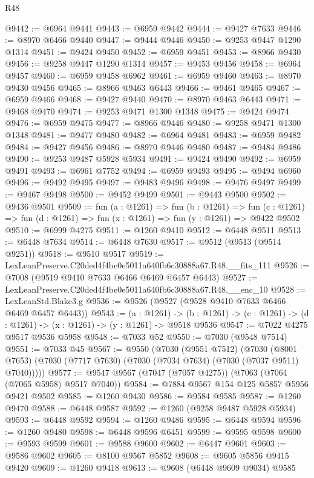 \begin{lexlean}{R48}
\begin{coremodule}
@9442 := @6964 @9441
@9443 := @6959 @9442
@9444 := @9427 @7633
@9446 := @8970 @6466 @9440
@9447 := @9444 @9446
@9450 := @9253 @9447 @1290 @1314
@9451 := @9424 @9450
@9452 := @6959 @9451
@9453 := @8966 @9430
@9456 := @9258 @9447 @1290 @1314
@9457 := @9453 @9456
@9458 := @6964 @9457
@9460 := @6959 @9458 @6962
@9461 := @6959 @9460
@9463 := @8970 @9430 @9456
@9465 := @8966 @9463 @6443
@9466 := @9461 @9465
@9467 := @6959 @9466
@9468 := @9427 @9440
@9470 := @8970 @9463 @6443
@9471 := @9468 @9470
@9474 := @9253 @9471 @1300 @1348
@9475 := @9424 @9474
@9476 := @6959 @9475
@9477 := @8966 @9446
@9480 := @9258 @9471 @1300 @1348
@9481 := @9477 @9480
@9482 := @6964 @9481
@9483 := @6959 @9482
@9484 := @9427 @9456
@9486 := @8970 @9446 @9480
@9487 := @9484 @9486
@9490 := @9253 @9487 @5928 @5934
@9491 := @9424 @9490
@9492 := @6959 @9491
@9493 := @6961 @7752
@9494 := @6959 @9493
@9495 := @9494 @6960
@9496 := @9492 @9495
@9497 := @9483 @9496
@9498 := @9476 @9497
@9499 := @9467 @9498
@9500 := @9452 @9499
@9501 := @9443 @9500
@9502 := @9436 @9501
@9509 := fun (a : @1261) =>
  fun (b : @1261) =>
  fun (c : @1261) => fun (d : @1261) => fun (x : @1261) => fun (y : @1261) => @9422 @9502
@9510 := @6999 @4275
@9511 := @1260 @9410
@9512 := @6448 @9511
@9513 := @6448 @7634
@9514 := @6448 @7630
@9517 := @9512 (@9513 (@9514 @9251))
@9518 := @9510 @9517
@9519 := LexLeanPreserve.C20ded4f4be0e5011a640fb6c30888a67.R48.__fits_111
@9526 := @7008 (@9519 @9410 @7633 @6466 @6469 @6457 @6443)
@9527 := LexLeanPreserve.C20ded4f4be0e5011a640fb6c30888a67.R48.__enc_10
@9528 := LexLeanStd.Blake3.g
@9536 := @9526 (@9527 (@9528 @9410 @7633 @6466 @6469 @6457 @6443))
@9543 := (a : @1261) ->
  (b : @1261) -> (c : @1261) -> (d : @1261) -> (x : @1261) -> (y : @1261) -> @9518 @9536
@9547 := @7022 @4275 @9517 @9536 @5958
@9548 := @7033 @52
@9550 := @7030 (@9548 @7514)
@9551 := @7033 @45
@9567 := @9550
    (@7030
      (@9551 @7512)
      (@7030 (@8001 @7653) (@7030 (@7717 @7630) (@7030 (@7034 @7634) (@7030 (@7037 @9511) @7040)))))
@9577 := @9547 @9567 (@7047 (@7057 @4275)) (@7063 (@7064 (@7065 @5958) @9517 @7040))
@9584 := @7884 @9567 @154 @125 @5857 @5956 @9421 @9502
@9585 := @1260 @9430
@9586 := @9584 @9585
@9587 := @1260 @9470
@9588 := @6448 @9587
@9592 := @1260 (@9258 @9487 @5928 @5934)
@9593 := @6448 @9592
@9594 := @1260 @9486
@9595 := @6448 @9594
@9596 := @1260 @9480
@9598 := @6448 @9596 @6451
@9599 := @9595 @9598
@9600 := @9593 @9599
@9601 := @9588 @9600
@9602 := @6447 @9601
@9603 := @9586 @9602
@9605 := @8100 @9567 @5852
@9608 := @9605 @5856 @9415 @9420
@9609 := @1260 @9418
@9613 := @9608 (@6448 @9609 @9034) @9585

\end{coremodule}
\end{lexlean}
